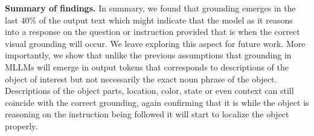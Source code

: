 \textbf{Summary of findings.} In summary, we found that grounding emerges in the last 40\% of the output text which might indicate that the model as it reasons into a response on the question or instruction provided that is when the correct visual grounding will occur. We leave exploring this aspect for future work. More importantly, we show that unlike the previous assumptions that grounding in MLLMs will emerge in output tokens that corresponds to descriptions of the object of interest but not necessarily the exact noun phrase of the object. Descriptions of the object parts, location, color, state or even context can still coincide with the correct grounding, again confirming that it is while the object is reasoning on the instruction being followed it will start to localize the object properly.